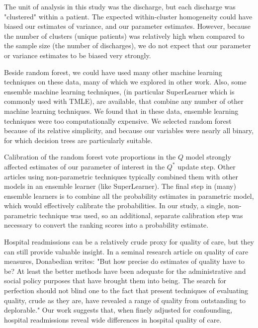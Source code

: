 \documentclass[]{article}\usepackage[]{graphicx}\usepackage[]{color}
\begin{document}
The unit of analysis in this study was the discharge, but each discharge was "clustered" within a patient. The expected within-cluster homogeneity could have biased our estimates of variance, and our parameter estimates. However, because the number of clusters (unique patients) was relatively high when compared to the sample size (the number of discharges), we do not expect that our parameter or variance estimates to be biased very strongly.

Beside random forest, we could have used many other machine learning techniques on these data, many of which we explored in other work.\supercite{hosseinzadeh_assessing_2013}  Also, some ensemble machine learning techniques, (in particular SuperLearner\supercite{van_der_laan_super_2007} which is commonly used with TMLE), are available, that combine any number of other machine learning techniques. We found that in these data, ensemble learning techniques were too computationally expensive. We selected random forest because of its relative simplicity, and because our variables were nearly all binary, for which decision trees are particularly suitable.

Calibration of the random forest vote proportions in the $Q$ model strongly affected estimates of our parameter of interest in the $Q^*$ update step. Other articles using non-parametric techniques typically combined them with other models in an ensemble learner (like SuperLearner). The final step in (many) ensemble learners is to combine all the probability estimates in parametric model, which would effectively calibrate the probabilities. In our study, a single, non-parametric technique was used, so an additional, separate calibration step was necessary to convert the ranking scores into a probability estimate.

Hospital readmissions can be a relatively crude proxy for quality of care, but they can still provide valuable insight. In a seminal research article on quality of care measures, Donabedian writes: "But how precise do estimates of quality have to be? At least the better methods have been adequate for the administrative and social policy purposes that have brought them into being. The search for perfection should not blind one to the fact that present techniques of evaluating quality, crude as they are, have revealed a range of quality from outstanding to deplorable."\supercite{donabedian_evaluating_1966} Our work suggests that, when finely adjusted for confounding, hospital readmissions reveal wide differences in hospital quality of care.
\end{document}

